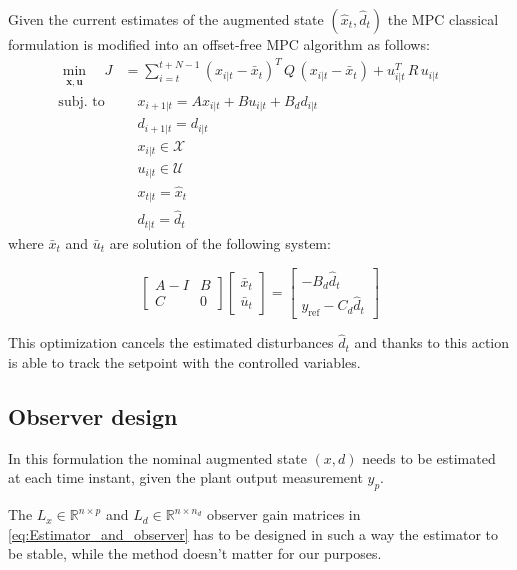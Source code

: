 \documentclass[a4paper,12pt,oneside]{book}
\begin{document}
\bigskip
Given the current estimates of the augmented state $(\hat{x}_t, \hat{d}_t)$ the MPC classical formulation is modified into an offset-free MPC algorithm as follows:
\begin{equation}
\begin{alignedat}{2}
	\min_{\substack{\boldsymbol{x}, \boldsymbol{u}}}\quad J &= \sum_{i=t}^{t+N-1} (x_{i|t} - \bar{x}_t) ^T \, Q \, (x_{i|t} -  \bar{x}_t) +  u_{i|t}^T \, R \, u_{i|t} &&  \\
	\text{subj. to} & \quad x_{i+1|t}  = A x_{i|t} + B u_{i|t} + B_d d_{i|t} &&  \\
    & \quad d_{i+1|t}  = d_{i|t} && \\
    &\quad x_{i|t} \in \mathcal{X} &&  \\
    &\quad u_{i|t} \in \mathcal{U} && \\
    &\quad x_{t|t} = \hat{x}_t && \\
    &\quad d_{t|t} = \hat{d}_t && 
\end{alignedat}
\label{MPC2}
\end{equation}
where $\bar{x}_t$ and $\bar{u}_t$ are solution of the following system:

\begin{equation}
    \begin{bmatrix}
    A-I & B \\
    C & 0
	\end{bmatrix}
 	\begin{bmatrix}
		\bar{x}_t \\
		\bar{u}_t
	\end{bmatrix}
    =
    \begin{bmatrix}
    -B_d \hat{d}_t\\
    y_{\text{ref}} - C_d \hat{d}_t
	\end{bmatrix}
\end{equation}

This optimization cancels the estimated disturbances $\hat{d}_t$ and thanks to this action is able to track the setpoint with the controlled variables.

\subsection{Observer design}
In this formulation the nominal augmented state $(x,d)$ needs to be estimated at each time instant, given the plant output measurement $y_p$.

The $L_x \in \mathbb{R}^{n \times p}$ and $L_d \in \mathbb{R}^{n \times n_d} $ observer gain matrices in \ref{eq:Estimator_and_observer} has to be designed in such a way the estimator to be stable, while the method doesn't matter for our purposes.
\end{document}
